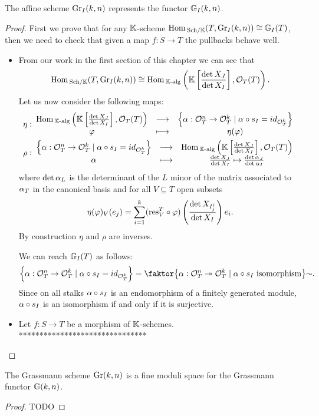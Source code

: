 \begin{proposition}\label{GrIRepresentGrIFunctors}
The affine scheme $\mathrm{Gr}_I(k,n)$ represents the functor $\mathbb{G}_I(k,n)$.
\end{proposition}
\begin{proof}
First we prove that for any $\mathbb{K}$-scheme $\mathrm{Hom}\,_{{\mathrm{Sch}}/{\mathbb{K}}}(T,\mathrm{Gr}_I(k,n))\cong \mathbb{G}_I(T)$, then we need to check that given a map $f:S\to T$ the pullbacks behave well.
\setlength{\leftmargini}{0cm}
\begin{itemize}
\item From our work in the first section of this chapter we can see that
\[\mathrm{Hom}\,_{{\mathrm{Sch}}/{\mathbb{K}}}(T,\mathrm{Gr}_I(k,n))\cong \mathrm{Hom}\,_{\mathbb{K}\text{-alg}}\left({\mathbb{K}\left[{\frac{\det X_J}{\det X_I}}\right],\mathcal{O}_T(T)}\right).\]
Let us now consider the following maps:
\begin{align*}
\eta:&\begin{array}{ccc} {\mathrm{Hom}\,_{\mathbb{K}\text{-alg}}\left({\mathbb{K}\left[{\frac{\det X_J}{\det X_I}}\right],\mathcal{O}_T(T)}\right)} & \longrightarrow & {\left\{{\alpha:\mathcal{O}_T^n\to \mathcal{O}_T^k\mid \alpha\circ s_I=id_{\mathcal{O}_T^k}}\right\}}\\ {\varphi} & \longmapsto & {\eta(\varphi)} \end{array}\\
\rho:&\begin{array}{ccc} {\left\{{\alpha:\mathcal{O}_T^n\to \mathcal{O}_T^k\mid \alpha\circ s_I=id_{\mathcal{O}_T^k}}\right\}} & \longrightarrow & {\mathrm{Hom}\,_{\mathbb{K}\text{-alg}}\left({\mathbb{K}\left[{\frac{\det X_J}{\det X_I}}\right],\mathcal{O}_T(T)}\right)}\\ {\alpha} & \longmapsto & {\frac{\det X_J}{\det X_I}\mapsto \frac{\det \alpha_J}{\det \alpha_I}} \end{array}
\end{align*}
where $\det \alpha_L$ is the determinant of the $L$ minor of the matrix associated to $\alpha_T$ in the canonical basis and for all $V\subseteq T$ open subsets
\[\eta(\varphi)_V(e_j)=\sum_{i=1}^k (\mathrm{res}^T_V\circ\varphi)\left({\frac{\det X_{I^i_j}}{\det X_I}}\right)e_i.\]
By construction $\eta$ and $\rho$ are inverses.
\medskip

\noindent We can reach $\mathbb{G}_I(T)$ as follows:
\[\cpa{\al:\Oc_T^n\to \Oc_T^k\mid \al\circ s_I=id_{\Oc_T^k}}=\quot{\cpa{\al:\Oc_T^n\onto \Oc_T^k\mid \al\circ s_I\text{ isomorphism}}}\sim.\]
Since on all stalks $\alpha\circ s_I$ is an endomorphism of a finitely generated module, $\alpha\circ s_I$ is an isomorphism if and only if it is surjective.
\item Let $f:S\to T$ be a morphism of $\mathbb{K}$-schemes. 
*******************************
\end{itemize}
\setlength{\leftmargini}{0.5cm}
\end{proof}

\begin{theorem}\label{GrassmannianIsModuliSpace}
The Grassmann scheme $\mathrm{Gr}(k,n)$ is a fine moduli space for the Grassmann functor $\mathbb{G}(k,n)$.
\end{theorem}
\begin{proof}
TODO
\end{proof}